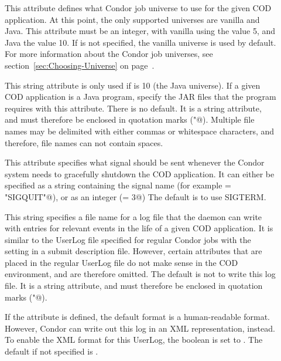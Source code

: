 \begin{description}
 \item[] This attribute defines what Condor job
   universe to use for the given COD application.
   At this point, the only supported universes are vanilla and Java.
   This attribute must be an integer, with vanilla using the value 5,
   and Java the value 10.
   If  is not specified, the vanilla universe is
   used by default.
   For more information about the Condor job universes, see
   section~\ref{sec:Choosing-Universe} on
   page~\pageref{sec:Choosing-Universe}. 

 \item[] This string attribute is only used if
    is 10 (the Java universe).
   If a given COD application is a Java program, specify the
   JAR files that the program requires with this attribute.
   There is no default.
   It is a string attribute, and must therefore be enclosed in 
   quotation marks (\verb@"@).
   Multiple file names may be delimited with either commas or whitespace
   characters, and
   therefore, file names can not contain spaces.

 \item[] This attribute specifies what signal should be
   sent whenever the Condor system needs to gracefully shutdown the
   COD application.
   It can either be specified as a string containing the signal name
   (for example \verb@KillSig = "SIGQUIT"@), or as an integer
   (\verb@KillSig = 3@)
   The default is to use SIGTERM.

 \item[] This string specifies a file name for a
   log file that the  daemon can write with entries
   for relevant 
   events in the life of a given COD application.
   It is similar to the UserLog file specified for regular Condor
   jobs with the  setting in a submit description
   file.
   However, certain attributes that are placed in the regular UserLog
   file do not make sense in the COD environment, and are therefore
   omitted.
   The default is not to write this log file.
   It is a string attribute, and must therefore be enclosed in 
   quotation marks (\verb@"@).

 \item[] If the 
   attribute is defined, the default format is a
   human-readable format.
   However, Condor can write out this log in an XML representation,
   instead.
   To enable the XML format for this UserLog, the
    boolean is set to \verb@TRUE@.
   The default if not specified is \verb@FALSE@.

\end{description}

